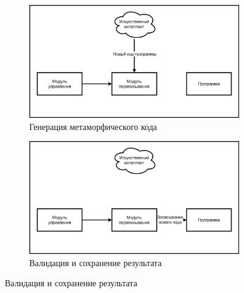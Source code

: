 \begin{figure}[ht!]
    \vspace{\baselineskip} %

    \begin{subfigure}[b]{0.5\textwidth}
        \centering
        \includegraphics[width=\textwidth]{images/METAMORPHLLM2.png} %
        \caption{Генерация метаморфического кода}
        \label{fig:photo_221_3}
    \end{subfigure}%
    \hfill %
    \begin{subfigure}[b]{0.5\textwidth}
        \centering
        \includegraphics[width=\textwidth]{images/METAMORPHLLM3.png} %
        \caption{Валидация и сохранение результата}
        \label{fig:photo_221_4}
    \end{subfigure}

    \vspace{\baselineskip} %


\end{figure}
